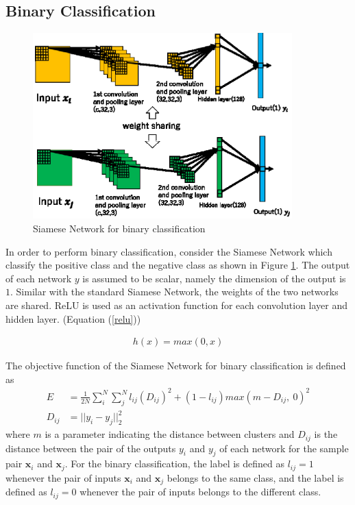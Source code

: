 \documentclass[runningheads,a4paper]{llncs}
\begin{document}
\subsection{Binary Classification}

\begin{figure}[ht]
\begin{center}
\includegraphics[width=100mm]{figure2.eps}
\caption{Siamese Network for binary classification}
\label{fig:siamese-bi}
\end{center}
\end{figure}

In order to perform binary classification, consider the Siamese Network which classify the positive class and the negative class as shown in Figure \ref{fig:siamese-bi}.
The output of each network $y$ is assumed to be scalar, namely the dimension of the output is $1$.
Similar with the standard Siamese Network, the weights of the two networks are shared.
ReLU is used as an activation function for each convolution layer and hidden layer. (Equation (\ref{relu}))

\begin{align} \label{relu}
h(x) = max(0,x)
\end{align}

The objective function of the Siamese Network for binary classification is defined as
\begin{align} \label{eq:siamese-loss}
E&=\frac{1}{2N}\sum_i^N \sum_j^N l_{ij}(D_{ij})^2 + (1-l_{ij})max(m-D_{ij}, ~0)^2 \\
D_{ij}&=||y_{i}- y_{j}||^2_2
\label{eq:siamese-dis}
\end{align}
where $m$ is a parameter indicating the distance between clusters and 
$D_{ij}$ is the distance between the pair of the outputs $y_i$ and $y_j$ of each network for the sample pair $\bm{x}_i$ and $\bm{x}_j$.
For the binary classification, the label is defined as $l_{ij}=1$ whenever the pair of inputs ${\bm x_i}$ and ${\bm x_j}$ belongs to the same class, and the label is defined as $l_{ij}=0$ whenever the pair of inputs belongs to the different class.
\end{document}
